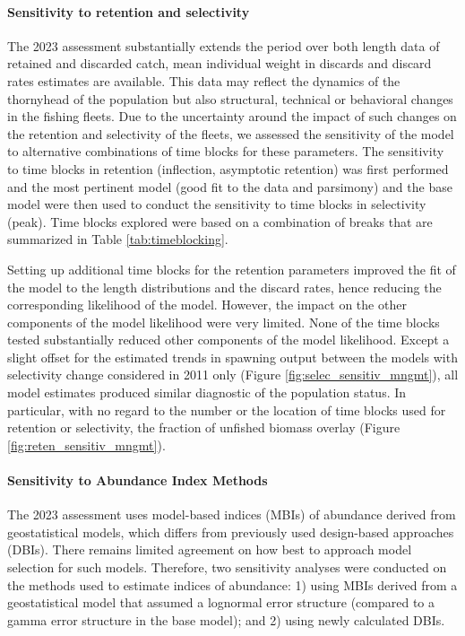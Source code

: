 \documentclass[11pt,
  english,
  letterpaper,
]{article}
\begin{document}
\hypertarget{sensitivity-to-retention-and-selectivity}{%
\paragraph{Sensitivity to retention and selectivity}\label{sensitivity-to-retention-and-selectivity}}

The 2023 assessment substantially extends the period over both length data of retained and discarded catch, mean individual weight in discards and discard rates estimates are available. This data may reflect the dynamics of the thornyhead of the population but also structural, technical or behavioral changes in the fishing fleets. Due to the uncertainty around the impact of such changes on the retention and selectivity of the fleets, we assessed the sensitivity of the model to alternative combinations of time blocks for these parameters. The sensitivity to time blocks in retention (inflection, asymptotic retention) was first performed and the most pertinent model (good fit to the data and parsimony) and the base model were then used to conduct the sensitivity to time blocks in selectivity (peak). Time blocks explored were based on a combination of breaks that are summarized in Table \ref{tab:timeblocking}.

Setting up additional time blocks for the retention parameters improved the fit of the model to the length distributions and the discard rates, hence reducing the corresponding likelihood of the model. However, the impact on the other components of the model likelihood were very limited. None of the time blocks tested substantially reduced other components of the model likelihood. Except a slight offset for the estimated trends in spawning output between the models with selectivity change considered in 2011 only (Figure \ref{fig:selec_sensitiv_mngmt}), all model estimates produced similar diagnostic of the population status. In particular, with no regard to the number or the location of time blocks used for retention or selectivity, the fraction of unfished biomass overlay (Figure \ref{fig:reten_sensitiv_mngmt}).

\hypertarget{sensitivity-to-abundance-index-methods}{%
\paragraph{Sensitivity to Abundance Index Methods}\label{sensitivity-to-abundance-index-methods}}

The 2023 assessment uses model-based indices (MBIs) of abundance derived from geostatistical models, which differs from previously used design-based approaches (DBIs). There remains limited agreement on how best to approach model selection for such models. Therefore, two sensitivity analyses were conducted on the methods used to estimate indices of abundance: 1) using MBIs derived from a geostatistical model that assumed a lognormal error structure (compared to a gamma error structure in the base model); and 2) using newly calculated DBIs.
\end{document}

